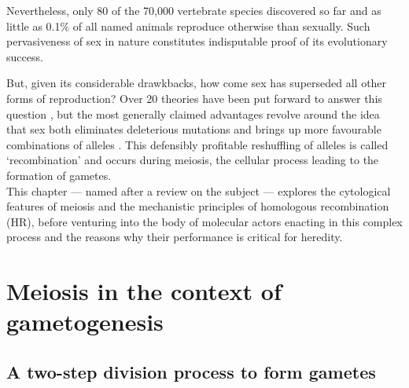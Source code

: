 Nevertheless, only 80 \citep{vrijenhoek1989list,neaves2011unisexual} of the 70,000 vertebrate species discovered so far \citep{iucn2019} and as little as 0.1\% of all named animals \citep{vrijenhoek1998animal} reproduce otherwise than sexually. 
Such pervasiveness of sex in nature constitutes indisputable proof of its evolutionary success. 

But, given its considerable drawkbacks, how come sex has superseded all other forms of reproduction?
Over 20 theories have been put forward to answer this question \citep{kondrashov1993classification}, but the most generally claimed advantages revolve around the idea that sex both eliminates deleterious mutations and brings up more favourable combinations of alleles \citep{normarck2003genomic, speijer2016can}. 
This defensibly profitable reshuffling of alleles is called ‘recombination’ and occurs during meiosis, the cellular process leading to the formation of gametes.\\

This chapter — named after a review on the subject \citep{hunter2015meiotic} — explores the cytological features of meiosis and the mechanistic principles of homologous recombination (HR), before venturing into the body of molecular actors enacting in this complex process and the reasons why their performance is critical for heredity.










\section{Meiosis in the context of gametogenesis}

\subsection{A two-step division process to form gametes}


